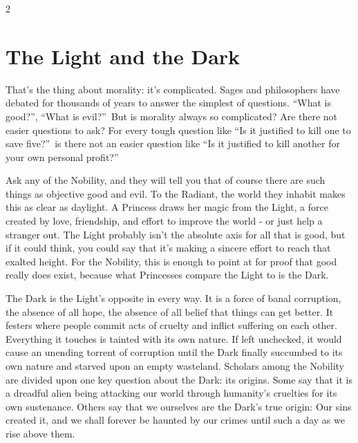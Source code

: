 \label{cha:NoblesseOblige}

\begin{multicols}{2}

\section*{The Light and the Dark}%
\label{sec:LightAndTheDark}

That's the thing about morality: it's complicated. Sages and philosophers have debated for thousands of years to answer the simplest of questions. \textquotedblleft What is good?\textquotedblright, \textquotedblleft What is evil?\textquotedblright\, But is morality always so complicated? Are there not easier questions to ask? For every tough question like \textquotedblleft Is it justified to kill one to save five?\textquotedblright\, is there not an easier question like \textquotedblleft Is it justified to kill another for your own personal profit?\textquotedblright

Ask any of the Nobility, and they will tell you that of course there are such things as objective good and evil. To the Radiant, the world they inhabit makes this as clear as daylight. A Princess draws her magic from the Light, a force created by love, friendship, and effort to improve the world - or just help a stranger out. The Light probably isn't the absolute axis for all that is good, but if it could think, you could say that it's making a sincere effort to reach that exalted height. For the Nobility, this is enough to point at for proof that good really does exist, because what Princesses compare the Light to is the Dark.

The Dark is the Light's opposite in every way. It is a force of banal corruption, the absence of all hope, the absence of all belief that things can get better. It festers where people commit acts of cruelty and inflict suffering on each other. Everything it touches is tainted with its own nature. If left unchecked, it would cause an unending torrent of corruption until the Dark finally succumbed to its own nature and starved upon an empty wasteland. Scholars among the Nobility are divided upon one key question about the Dark: its origins. Some say that it is a dreadful alien being attacking our world through humanity's cruelties for its own sustenance. Others say that we ourselves are the Dark's true origin: Our sins created it, and we shall forever be haunted by our crimes until such a day as we rise above them. 


\end{multicols}
